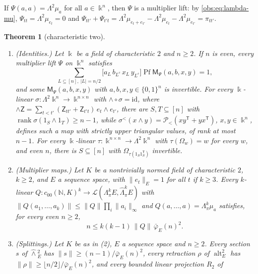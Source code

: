 \documentclass[11pt]{amsart}
\newtheorem{theorem}{Theorem}[section]
\theoremstyle{definition}
\theoremstyle{remark}
\numberwithin{equation}{section}
\newcommand{\N}{\mathbb N}
\newcommand{\cL}{\mathcal L}
\newcommand{\id}{\mathrm{id}}
\newcommand{\abs}[1]{\lvert #1\rvert}
\newcommand{\norm}[1]{\lVert #1\rVert}
\theoremstyle{plain}
\theoremstyle{definition}
\theoremstyle{plain}
\newcommand{\alt}{\operatorname{alt}}
\newcommand{\cP}{\mathcal P}
\begin{document}
If $\Psi(a,a)=\Lambda^2\mu_a$ for all $a\in\Bbbk^n$, then $\Psi$ is a multiplier lift: by \eqref{obs:eq:lambda-mu},
$\Psi_{tt}=\Lambda^2\mu_{e_t}=0$ and
$\Psi_{tt'}+\Psi_{t't}=\Lambda^2\mu_{e_t+e_{t'}}-\Lambda^2\mu_{e_t}-\Lambda^2\mu_{e_{t'}}=\pi_{tt'}$.

\begin{theorem}[characteristic two]\label{obs:thm:char-two}
\leavevmode
\begin{enumerate}
\item \textup{(Identities.)} Let $\Bbbk$ be a field of characteristic $2$ and $n\ge2$. If $n$ is even, every multiplier lift
$\Psi$ on $\Bbbk^n$ satisfies
\begin{equation}\label{obs:eq:pfaffian-identity}
\sum_{L\subseteq[n],\ \abs L=n/2}\bigl[a_L\,b_{L^c}\,x_L\,y_{L^c}\bigr]\operatorname{Pf}\mathsf M_\Psi(a,b,x,y)=1,
\end{equation}
and some $\mathsf M_\Psi(a,b,x,y)$ with $a,b,x,y\in\{0,1\}^n$ is invertible. For every $\Bbbk$-linear
$\sigma\colon\Lambda^2\Bbbk^n\to\Bbbk^{n\times n}$ with $\wedge\circ\sigma=\id$, where
$\wedge\mathsf Z=\sum_{t<t'}(\mathsf Z_{tt'}+\mathsf Z_{t't})\,e_t\wedge e_{t'}$, there are $S,T\subseteq[n]$ with
$\operatorname{rank}\sigma(1_S\wedge1_T)\ge n-1$, while $\sigma^<(x\wedge y)=\cP_<(xy^{\mathsf T}+yx^{\mathsf T})$,
$x,y\in\Bbbk^n$, defines such a map with strictly upper triangular values, of rank at most $n-1$. For every
$\Bbbk$-linear $\tau\colon\Bbbk^{n\times n}\to\Lambda^2\Bbbk^n$ with $\tau(\Omega_w)=w$ for every $w$, and even $n$,
there is $S\subseteq[n]$ with $\Omega_{\tau(1_S1_S^{\mathsf T})}$ invertible.
\item \textup{(Multiplier maps.)} Let $K$ be a nontrivially normed field of characteristic $2$, $k\ge2$, and $E$ a
sequence space, with $\norm{e_t}_E=1$ for all $t$ if $k\ge3$. Every $k$-linear
$Q\colon c_{00}(\N,K)^k\to\cL(\Lambda^k_\pi E,\widehat\Lambda^k_\pi E)$ with
$\norm{Q(a_1,\dots,a_k)}\le\norm Q\prod_i\norm{a_i}_\infty$ and $Q(a,\dots,a)=\Lambda^k_\pi\mu_a$ satisfies, for every
even $n\ge2$,
\begin{equation}\label{obs:eq:multiplier-bound}
n\le k(k-1)\,\norm Q\,\bar\varphi_E(n)^2 .
\end{equation}
\item \textup{(Splittings.)} Let $K$ be as in \textup{(2)}, $E$ a sequence space and $n\ge2$. Every section $s$ of
$\widehat\wedge{}^2_E$ has $\norm s\ge(n-1)/\bar\varphi_E(n)^2$, every retraction $\rho$ of $\alt^2_E$ has
$\norm\rho\ge\lfloor n/2\rfloor/\bar\varphi_E(n)^2$, and every bounded linear projection $R_2$ of

\end{enumerate}
\end{theorem}
\end{document}
